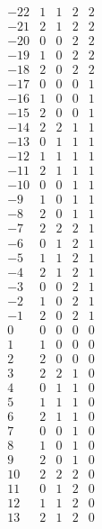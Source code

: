 \documentclass[a4paper,12pt]{amsart}
\newcommand{\0}{\mathtt{0}}
\newcommand{\1}{\mathtt{1}}
\newcommand{\2}{\mathtt{2}}
\newcommand{\3}{\mathtt{3}}
\begin{document}
\begin{table}
\[\begin{array}{c|cccc}
  -22  &  1  &  1    & 2   & 2 \\
  -21  &  2  &  1    & 2   & 2 \\
  -20  &  0  &  0    & 2   & 2 \\
  -19  &  1  &  0    & 2   & 2 \\
  -18  &  2  &  0    & 2   & 2 \\
  -17  &  0  &  0    & 0   & 1 \\
  -16  &  1  &  0    & 0   & 1 \\
  -15  &  2  &  0    & 0   & 1 \\
  -14  &  2  &  2    & 1   & 1 \\
  -13  &  0  &  1    & 1   & 1 \\
  -12  &  1  &  1    & 1   & 1 \\
  -11  &  2  &  1    & 1   & 1 \\
  -10  &  0  &  0    & 1   & 1 \\
  -9   &  1  &  0    & 1   & 1 \\
  -8   &  2  &  0    & 1   & 1 \\
  -7   &  2  &  2    & 2   & 1 \\
  -6   &  0  &  1    & 2   & 1 \\
  -5   &  1  &  1    & 2   & 1 \\
  -4   &  2  &  1    & 2   & 1 \\
  -3   &  0  &  0    & 2   & 1 \\
  -2   &  1  &  0    & 2   & 1 \\
  -1   &  2  &  0    & 2   & 1 \\
  0    &  0  &  0    & 0   & 0 \\
  1    &  1  &  0    & 0   & 0 \\
  2    &  2  &  0    & 0   & 0 \\
  3    &  2  &  2    & 1   & 0 \\
  4    &  0  &  1    & 1   & 0 \\
  5    &  1  &  1    & 1   & 0 \\
  6    &  2  &  1    & 1   & 0 \\
  7    &  0  &  0    & 1   & 0 \\
  8    &  1  &  0    & 1   & 0 \\
  9    &  2  &  0    & 1   & 0 \\
  10   &  2  &  2    & 2   & 0 \\
  11   &  0  &  1    & 2   & 0 \\
  12   &  1  &  1    & 2   & 0 \\
  13   &  2  &  1    & 2   & 0 \\

\end{array}\]
\end{table}
\end{document}
